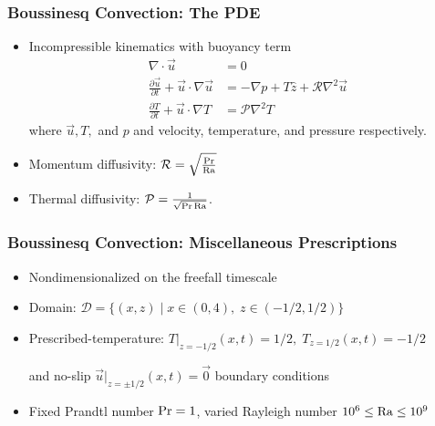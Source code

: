 


\begin{frame}[fragile]
    \frametitle{Boussinesq Convection: The PDE}
    \begin{itemize}
        \item Incompressible kinematics with buoyancy term
        \begin{align}
            \nabla \cdot \vec{u} &= 0 \label{EQ:motion1}\\
            \frac{\partial \vec{u}}{\partial t} + \vec{u} \cdot \nabla \vec{u} &= - \nabla p + T \hat{z} + \mathcal{R} \nabla^2 \vec{u} \label{EQ:motion2}\\
            \frac{\partial T}{\partial t} + \vec{u} \cdot \nabla T &= \mathcal{P} \nabla^2 T \label{EQ:motion3}
        \end{align}
        where $\vec{u},T,$ and $p$ and velocity, temperature, and pressure respectively.
        \vspace{0.2cm}
        \item Momentum diffusivity: $\mathcal{R} = \sqrt{\frac{\Pr}{\mathrm{Ra}}}$ 
        
        \item Thermal diffusivity: $\mathcal{P} = \frac{1}{\sqrt{\Pr \mathrm{Ra}}}$.
    \end{itemize}
\end{frame}


\begin{frame}[fragile]
    \frametitle{Boussinesq Convection: Miscellaneous Prescriptions}

    \begin{itemize}
        
        \item Nondimensionalized on the freefall timescale\newline
        \item Domain: $\mathcal{D}=\{ (x,z)\;|\; x\in(0,4),\; z\in(-1/2,1/2)\}$\newline
        \item Prescribed-temperature:
        $T|_{z=-1/2}(x,t)=1/2, \; T_{z=1/2}(x,t)=-1/2$\newline

        and no-slip $\vec{u}|_{z=\pm1/2}(x,t) = \vec{0}$ boundary conditions\newline

        \item Fixed Prandtl number $\rm{Pr}=1$, varied Rayleigh number $10^6\leq \rm{Ra}\leq 10^9$
    \end{itemize}
\end{frame}


